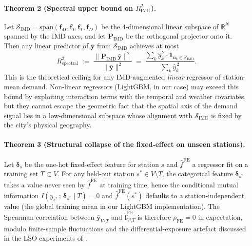 \paragraph{Theorem 2 (Spectral upper bound on $R^2_{\mathrm{IMD}}$).}
Let $\mathcal{S}_{\mathrm{IMD}} = \mathrm{span}(\mathbf{f}_M,
\mathbf{f}_I, \mathbf{f}_T, \mathbf{f}_D)$ be the $4$-dimensional
linear subspace of $\mathbb{R}^N$ spanned by the IMD axes, and
let $\mathbf{P}_{\mathrm{IMD}}$ be the orthogonal projector onto
it.  Then any linear predictor of $\bar{\mathbf{y}}$ from
$\mathcal{S}_{\mathrm{IMD}}$ achieves at most
\begin{equation}
    R^2_{\mathrm{spectral}} \;:=\;
    \frac{\|\mathbf{P}_{\mathrm{IMD}}\, \bar{\mathbf{y}}\|^2}
         {\|\bar{\mathbf{y}}\|^2}
    \;=\;
    \frac{\sum_k \hat{y}_k^{\,2} \cdot \mathbb{1}_{\mathbf{u}_k \in \mathcal{S}_{\mathrm{IMD}}}}
         {\sum_k \hat{y}_k^{\,2}}.
    \label{eq:r2-spectral}
\end{equation}
This is the theoretical ceiling for any IMD-augmented
\emph{linear} regressor of station-mean demand.  Non-linear
regressors (LightGBM, in our case) may exceed this bound by
exploiting interaction terms with the temporal and weather
covariates, but they cannot escape the geometric fact that the
spatial axis of the demand signal lies in a low-dimensional
subspace whose alignment with $\mathcal{S}_{\mathrm{IMD}}$ is
fixed by the city's physical geography.

\paragraph{Theorem 3 (Structural collapse of the fixed-effect on
unseen stations).}
Let $\boldsymbol{\delta}_s$ be the one-hot fixed-effect feature
for station $s$ and $\hat{f}^{\mathrm{FE}}$ a regressor fit on a
training set $T \subset V$.  For any held-out station
$s^* \in V \setminus T$, the categorical feature
$\boldsymbol{\delta}_{s^*}$ takes a value never seen by
$\hat{f}^{\mathrm{FE}}$ at training time, hence the conditional
mutual information
$I(\bar{y}_{s^*}\,;\, \boldsymbol{\delta}_{s^*} \mid T) = 0$ and
$\hat{f}^{\mathrm{FE}}(s^*)$ defaults to a station-independent
value (the global training mean in our LightGBM implementation).
The Spearman correlation between $\bar{\mathbf{y}}_{V \setminus T}$
and $\hat{\mathbf{f}}^{\mathrm{FE}}_{V \setminus T}$ is therefore
$\rho_{\mathrm{FE}} = 0$ in expectation, modulo finite-sample
fluctuations and the differential-exposure artefact discussed
in the LSO experiments of \citet{Fosse2026imd_national}.

